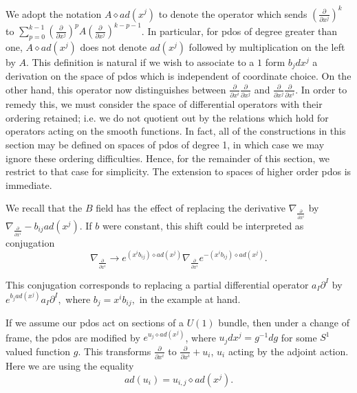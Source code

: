 \documentclass[a4paper,11pt]{amsart}
\begin{document}
We adopt the notation $A\diamond ad(x^j)$ to denote the operator
which sends $(\frac{\partial}{\partial x^j})^k$ to 
$\sum_{p=0}^{k-1}(\frac{\partial}{\partial x^j})^pA(\frac{\partial}{\partial
x^j})^{k-p-1}$. In particular, for pdos of degree greater than one, 
$A\diamond ad(x^j)$ does not denote $ad(x^j)$ followed by multiplication on the
left by $A$. This definition is natural if we wish to associate to a 
$1$ form $b_jdx^j$ a derivation on the space of pdos which is independent 
of coordinate choice.  On the other hand, this operator now
distinguishes between 
$\frac{\partial}{\partial x^i}\frac{\partial}{\partial x^j}$ and 
$\frac{\partial}{\partial x^j}\frac{\partial}{\partial x^i}$. In order to remedy
this, we must consider the space of differential operators with their ordering
 retained; i.e. we do not quotient out by the relations which hold for
 operators acting on the smooth functions. In fact, all of the constructions in
 this section may be defined on spaces of pdos of degree 1, in which case we may
 ignore these ordering difficulties. 
 Hence, for the remainder of this section,  we restrict to that case for
  simplicity. The extension to spaces of higher order pdos is immediate. 
  
 We recall that the $B$ field has the effect of replacing the derivative 
 $\nabla_{\frac{\partial}{\partial x^i}}$ by
   $\nabla_{\frac{\partial}{\partial x^i}} - b_{ij}ad(x^j).$
If $b$ were constant, this shift could be interpreted as conjugation 
$$\nabla_{\frac{\partial}{\partial x^i}}\rightarrow 
e^{(x^ib_{ij})\diamond ad(x^j)}\nabla_{\frac{\partial}{\partial
x^i}}e^{-(x^ib_{ij})\diamond ad(x^j)}.$$ 

This conjugation corresponds to replacing a partial differential operator 
$a_I\partial^I$ by $e^{b_jad(x^j)}a_I\partial^I,$
where $b_j = x^ib_{ij},$ in the example at hand.  


If we assume our pdos act on sections of a $U(1)$ bundle, then under a change of
frame, the pdos are modified by $e^{u_j\diamond ad(x^j)}$, where 
$u_jdx^j = g^{-1}dg$ for some $S^1$ valued function $g$. This transforms
$\frac{\partial}{\partial x^i}$ to 
$\frac{\partial}{\partial x^i} + u_i$, $u_i$ acting by the adjoint
action. Here we are using the equality 
$$ad(u_i) = u_{i,j}\diamond ad(x^j).$$
\end{document}
